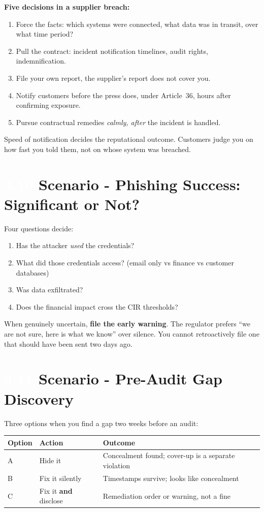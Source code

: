 \documentclass[11pt,a4paper,twoside]{book}
\newcommand{\lessontag}[1]{%
  \texorpdfstring{%
    \setlength{\fboxsep}{3pt}\colorbox{nisd2blue}{\textcolor{white}{\footnotesize\bfseries #1}}\quad%
  }{Lesson #1\ }%
}
\begin{document}
\textbf{Five decisions in a supplier breach:}

\begin{enumerate}
  \item Force the facts: which systems were connected, what data was in transit, over what time period?
  \item Pull the contract: incident notification timelines, audit rights, indemnification.
  \item File your own report, the supplier's report does not cover you.
  \item Notify customers before the press does, under Article~36, hours after confirming exposure.
  \item Pursue contractual remedies \emph{calmly, after} the incident is handled.
\end{enumerate}

Speed of notification decides the reputational outcome. Customers judge you on how fast you told them, not on whose system was breached.

\section{\lessontag{3.10}Scenario - Phishing Success: Significant or Not?}

Four questions decide:

\begin{enumerate}
  \item Has the attacker \emph{used} the credentials?
  \item What did those credentials access? (email only vs finance vs customer databases)
  \item Was data exfiltrated?
  \item Does the financial impact cross the CIR thresholds?
\end{enumerate}

When genuinely uncertain, \textbf{file the early warning}. The regulator prefers ``we are not sure, here is what we know'' over silence. You cannot retroactively file one that should have been sent two days ago.

\section{\lessontag{3.11}Scenario - Pre-Audit Gap Discovery}

Three options when you find a gap two weeks before an audit:

\begin{center}
\begin{tabular}{@{}lll@{}}
\toprule
\textbf{Option} & \textbf{Action} & \textbf{Outcome} \\
\midrule
A & Hide it & Concealment found; cover-up is a separate violation \\
B & Fix it silently & Timestamps survive; looks like concealment \\
C & Fix it \textbf{and} disclose & \textcolor{successgreen}{Remediation order or warning, not a fine} \\
\bottomrule
\end{tabular}
\end{center}
\end{document}
